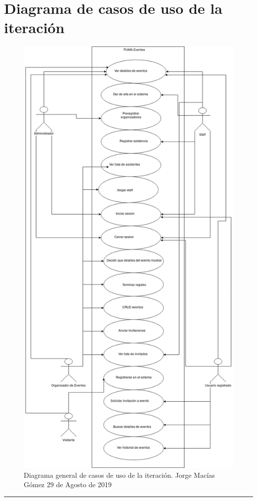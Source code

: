 \documentclass{article}
\begin{document}
\section{Diagrama de casos de uso de la iteración}
\begin{figure}[H]
  \begin{center}
    \includegraphics[scale=.3]{../imagenes/diagrama_general.png}
  \end{center}
  \caption{Diagrama general de casos de uso de la iteración. Jorge Macías Gómez
    29 de Agosto de 2019}
  \label{fig:diagrama}
\end{figure}
\rule{1\textwidth}{.8pt}\\
\end{document}
